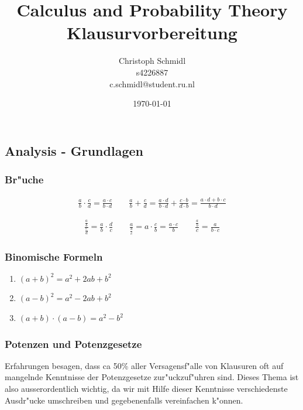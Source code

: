 \documentclass[a4paper]{article}
\title{Calculus and Probability Theory\\Klausurvorbereitung}
\author{Christoph Schmidl\\
s4226887\\
c.schmidl@student.ru.nl}
\date{\today}
\begin{document}
\maketitle



\subsection*{Analysis - Grundlagen}

\subsubsection*{Br"uche}

\begin{align*}
	\frac{a}{b} \cdot \frac{c}{d} = \frac{a \cdot c}{b \cdot d} \qquad \frac{a}{b} + \frac{c}{d} = \frac{a \cdot d}{b \cdot d} + \frac{c \cdot b}{d \cdot b} = \frac{a \cdot d + b \cdot c}{b \cdot d}
\end{align*}

\begin{align*}
\frac{\frac{a}{b}}{\frac{c}{d}} = \frac{a}{b} \cdot \frac{d}{c} \qquad \frac{a}{\frac{b}{c}} = a \cdot \frac{c}{b} = \frac{a \cdot c}{b} \qquad \frac{\frac{a}{b}}{c} = \frac{a}{b \cdot c}
\end{align*}



\subsubsection*{Binomische Formeln}

\begin{enumerate}
	\item $(a + b)^2 = a^2 + 2ab + b^2$
	\item $(a - b)^2 = a^2 - 2ab + b^2$
	\item $(a + b) \cdot (a - b) = a^2 - b^2$
\end{enumerate}


\subsubsection*{Potenzen und Potenzgesetze}

Erfahrungen besagen, dass ca 50\% aller Versagensf"alle von Klausuren oft auf mangelnde Kenntnisse der Potenzgesetze zur"uckzuf"uhren sind. Dieses Thema ist also ausserordentlich wichtig, da wir mit Hilfe dieser Kenntnisse verschiedenste Ausdr"ucke umschreiben und gegebenenfalls vereinfachen k"onnen.\\
\end{document}
